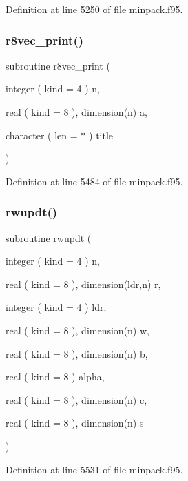 Definition at line 5250 of file minpack.\+f95.

\mbox{\label{minpack_8f95_adc196cc5030b2eb1660c061fd85bfe0a}} 
\subsubsection{\texorpdfstring{r8vec\+\_\+print()}{r8vec\_print()}}
{\footnotesize\ttfamily subroutine r8vec\+\_\+print (\begin{DoxyParamCaption}\item[{integer ( kind = 4 )}]{n,  }\item[{real ( kind = 8 ), dimension(n)}]{a,  }\item[{character ( len = $\ast$ )}]{title }\end{DoxyParamCaption})}



Definition at line 5484 of file minpack.\+f95.

\mbox{\label{minpack_8f95_adbcfef20d552d8c5e7dc5925c975eb23}} 
\subsubsection{\texorpdfstring{rwupdt()}{rwupdt()}}
{\footnotesize\ttfamily subroutine rwupdt (\begin{DoxyParamCaption}\item[{integer ( kind = 4 )}]{n,  }\item[{real ( kind = 8 ), dimension(ldr,n)}]{r,  }\item[{integer ( kind = 4 )}]{ldr,  }\item[{real ( kind = 8 ), dimension(n)}]{w,  }\item[{real ( kind = 8 ), dimension(n)}]{b,  }\item[{real ( kind = 8 )}]{alpha,  }\item[{real ( kind = 8 ), dimension(n)}]{c,  }\item[{real ( kind = 8 ), dimension(n)}]{s }\end{DoxyParamCaption})}



Definition at line 5531 of file minpack.\+f95.

